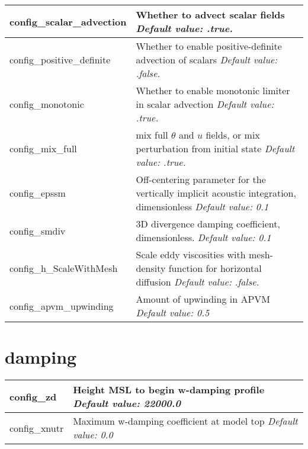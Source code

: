 {\begin{longtable}{|p{1.75in} |p{4.5in}|}
   config\_scalar\_advection & Whether to advect scalar fields \newline 
   {\em Default value: .true.} \\ \hline   

   config\_positive\_definite & Whether to enable positive-definite advection of scalars \newline 
   {\em Default value: .false.} \\ \hline

   config\_monotonic & Whether to enable monotonic limiter in scalar advection \newline 
   {\em Default value: .true.} \\ \hline

   config\_mix\_full & mix full $\theta$ and $u$ fields, or mix perturbation from initial state \newline 
   {\em Default value: .true.} \\ \hline   
      
   config\_epssm & Off-centering parameter for the vertically implicit acoustic \hfill \break integration, dimensionless \newline 
   {\em Default value: 0.1} \\ \hline

   config\_smdiv & 3D divergence damping coefficient, dimensionless. \newline 
   {\em Default value: 0.1} \\ \hline

   config\_h\_ScaleWithMesh & Scale eddy viscosities with mesh-density function for horizontal diffusion \newline 
   {\em Default value: .false.} \\ \hline
   
   config\_apvm\_upwinding & Amount of upwinding in APVM \newline 
   {\em Default value: 0.5} \\ \hline   

\end{longtable}
}

\section{damping}

{\small
\begin{longtable}{|p{2.0in} |p{4.25in}|}
 \hline
   config\_zd & Height MSL to begin w-damping profile \newline 
   {\em Default value: 22000.0} \\ \hline

   config\_xnutr & Maximum w-damping coefficient at model top \newline 
   {\em Default value: 0.0} \\ \hline
\end{longtable}
}


